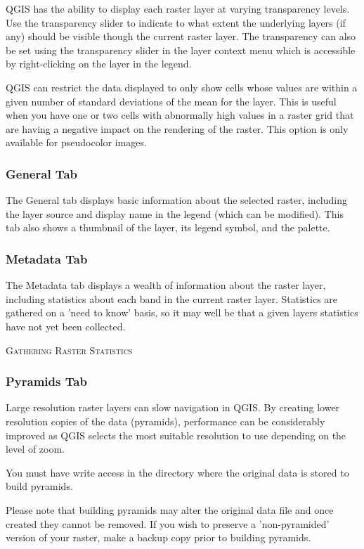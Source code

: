 QGIS has the ability to display each raster layer at varying transparency
levels. Use the transparency slider to indicate to
what extent the underlying layers (if any) should be visible though the
current raster layer. The transparency can also be set using the transparency
slider in the layer context menu which is accessible by right-clicking on the
layer in the legend.

QGIS can restrict the data displayed to only show cells whose values are
within a given number of standard deviations of the mean for the
layer. This is useful when you have one or
two cells with abnormally high values in a raster grid that are having a
negative impact on the rendering of the raster. This option is only available
for pseudocolor images.

\subsubsection{General Tab}\label{label_generaltab}

The General tab displays basic information about the selected raster,
including the layer source and  display name in the legend (which can be
modified). This tab also shows a thumbnail of the layer, its legend symbol,
and the palette.

\subsubsection{Metadata Tab}\label{label_metatab}

The Metadata tab displays a wealth of information about the raster layer,
including statistics about each band in the current raster layer. Statistics
are gathered on a 'need to know' basis, so it may well be that a given layers
statistics have not yet been collected.


\begin{Tip}\caption{\textsc{Gathering Raster Statistics}}
\end{Tip}

\subsubsection{Pyramids Tab}\label{raster_pyramids}

Large resolution raster layers can slow navigation in QGIS. By creating lower
resolution copies of the data (pyramids), performance can be considerably
improved as QGIS selects the most suitable resolution to use depending on the
level of zoom. 

You must have write access in the directory where the original data is stored
to build pyramids. 

Please note that building pyramids may alter the original data file and once
created they cannot be removed. If you wish to preserve a 'non-pyramided'
version of your raster, make a backup copy prior to building pyramids.
